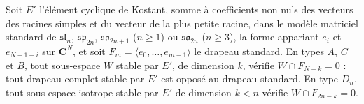 \begin{encadre}
\begin{enonce}
Soit $E'$ l'élément cyclique de Kostant, somme à coefficients non nuls des vecteurs des racines simples et du vecteur de la plus petite racine, dans le modèle matriciel standard de $\mathfrak{sl}_n$, $\mathfrak{sp}_{2n}$, $\mathfrak{so}_{2n+1}$ ($n \geq 1$) ou $\mathfrak{so}_{2n}$ ($n \geq 3$), la forme appariant $e_i$ et $e_{N-1-i}$ sur $\mathbf C^N$, et soit $F_m = \langle e_0, \ldots, e_{m-1} \rangle$ le drapeau standard. En types $A$, $C$ et $B$, tout sous-espace $W$ stable par $E'$, de dimension $k$, vérifie $W \cap F_{N-k} = 0$ : tout drapeau complet stable par $E'$ est opposé au drapeau standard. En type $D_n$, tout sous-espace isotrope stable par $E'$ de dimension $k < n$ vérifie $W \cap F_{2n-k} = 0$.
\end{enonce}
\end{encadre}
